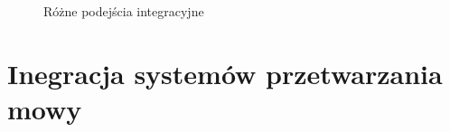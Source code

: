 \setlength\fboxsep{20pt}
\setlength\fboxrule{1pt}
\begin{figure}[!h]
	\centering
	\caption{Różne podejścia integracyjne  \cite{chappell2004}}\label{fig:podejscia_integracyjne}
\end{figure}

\newpage

\section{Inegracja systemów przetwarzania mowy}

